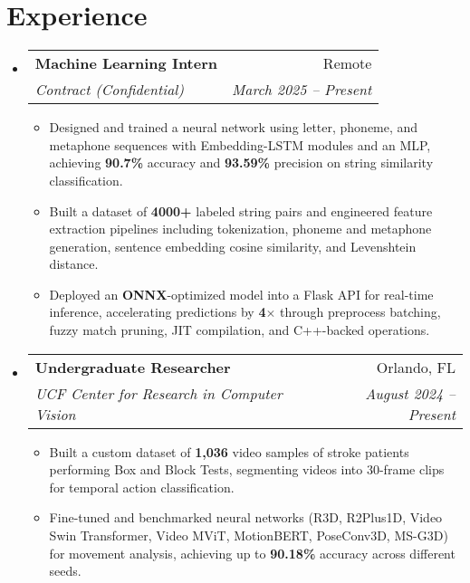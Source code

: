 \documentclass[letterpaper,11pt]{article}
\makeatletter
\newcommand{\resumeItem}[1]{
  \item\small{
    {#1 \vspace{-2pt}}
  }
}
\newcommand{\resumeSubheading}[4]{
  \vspace{-2pt}\item
    \begin{tabular*}{0.97\textwidth}[t]{l@{\extracolsep{\fill}}r}
      \textbf{#1} & #2 \\
      \textit{\small#3} & \textit{\small #4} \\
    \end{tabular*}\vspace{-7pt}
}
\newcommand{\resumeSubHeadingListStart}{\begin{itemize}[leftmargin=0.15in, label={}]}
\newcommand{\resumeSubHeadingListEnd}{\end{itemize}}
\newcommand{\resumeItemListStart}{\begin{itemize}}
\newcommand{\resumeItemListEnd}{\end{itemize}\vspace{-5pt}}
\makeatother
\begin{document}
\section{Experience}
  \resumeSubHeadingListStart
    \resumeSubheading
      {Machine Learning Intern}{Remote}
      {Contract (Confidential)}{March 2025 -- Present}
      \resumeItemListStart
        \resumeItem{Designed and trained a neural network using letter, phoneme, and metaphone sequences with Embedding-LSTM modules and an MLP, achieving \textbf{90.7\%} accuracy and \textbf{93.59\%} precision on string similarity classification.}
        \resumeItem{Built a dataset of \textbf{4000+} labeled string pairs and engineered feature extraction pipelines including tokenization, phoneme and metaphone generation, sentence embedding cosine similarity, and Levenshtein distance.}
        \resumeItem{Deployed an \textbf{ONNX}-optimized model into a Flask API for real-time inference, accelerating predictions by \textbf{4$\times$} through preprocess batching, fuzzy match pruning, JIT compilation, and C++-backed operations.}
      \resumeItemListEnd
    \resumeSubheading
      {Undergraduate Researcher}{Orlando, FL}
      {UCF Center for Research in Computer Vision}{August 2024 -- Present}
      \resumeItemListStart
        \resumeItem{Built a custom dataset of \textbf{1,036} video samples of stroke patients performing Box and Block Tests, segmenting videos into 30-frame clips for temporal action classification.}
        \resumeItem{Fine-tuned and benchmarked neural networks (R3D, R2Plus1D, Video Swin Transformer, Video MViT, MotionBERT, PoseConv3D, MS-G3D) for movement analysis, achieving up to \textbf{90.18\%} accuracy across different seeds.}
      \resumeItemListEnd
  \resumeSubHeadingListEnd
\end{document}
